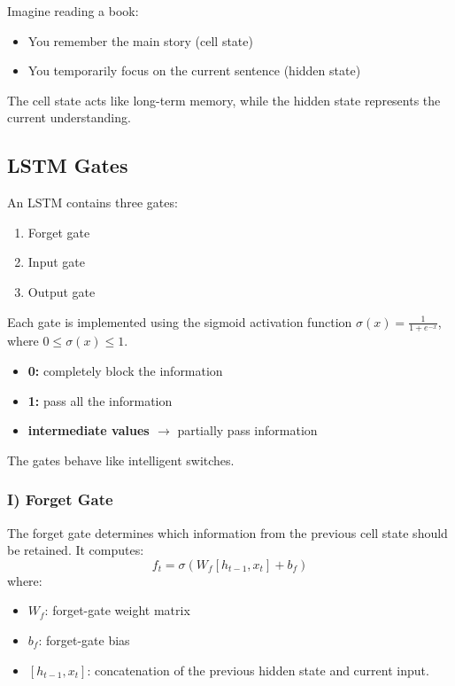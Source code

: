 \begin{advbox}[Intuition]
Imagine reading a book:
\begin{itemize}
    \item You remember the main story (cell state)
    \item You temporarily focus on the current sentence (hidden state)
\end{itemize}
The cell state acts like long-term memory, while the hidden state represents the current understanding.
\end{advbox}

\subsection{LSTM Gates}

An LSTM contains three gates:
\begin{enumerate}
    \item Forget gate
    \item Input gate
    \item Output gate
\end{enumerate}

Each gate is implemented using the sigmoid activation function $\sigma(x) = \frac{1}{1 + e^{-x}}$, where $0 \le \sigma(x) \le 1$.
\begin{itemize}
    \item \textbf{0:} completely block the information
    \item \textbf{1:} pass all the information
    \item \textbf{intermediate values $\to$} partially pass information
\end{itemize}
The gates behave like intelligent switches.

\subsubsection{I) Forget Gate}

The forget gate determines which information from the previous cell state should be retained. It computes:
\begin{equation}
f_t = \sigma(W_f [h_{t-1}, x_t] + b_f)
\end{equation}
where:
\begin{itemize}
    \item $W_f$: forget-gate weight matrix
    \item $b_f$: forget-gate bias
    \item $[h_{t-1}, x_t]$: concatenation of the previous hidden state and current input.
\end{itemize}

